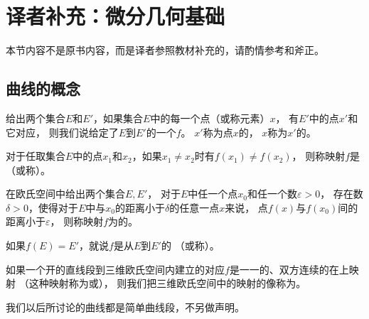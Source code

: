 \section{译者补充：微分几何基础}\label{sec:译者补充：微分几何基础}
\begin{remark}
    本节内容不是原书内容，而是译者参照教材补充的，请酌情参考和斧正。
\end{remark}

\subsection{曲线的概念}\label{sub:曲线的概念}
\begin{definition}
    给出两个集合$E$和$E'$，如果集合$E$中的每一个点（或称元素）$x$，
    有$E'$中的点$x'$和它对应，
    则我们说给定了$E$到$E'$的一个$f$。
    $x'$称为点$x$的，
    $x$称为$x'$的。
\end{definition}
\begin{definition}
    对于任取集合$E$中的点$x_1$和$x_2$，如果$x_1\neq x_2$时有$f(x_1)\neq f(x_2)$，
    则称映射$f$是（或称）。
\end{definition}
\begin{definition}
    在欧氏空间中给出两个集合$E,E'$，
    对于$E$中任一个点$x_0$和任一个数$\varepsilon>0$，
    存在数$\delta>0$，使得对于$E$中与$x_0$的距离小于$\delta$的任意一点$x$来说，
    点$f(x)$与$f(x_0)$间的距离小于$\varepsilon$，
    则称映射$f$为的。
\end{definition}
\begin{definition}
    如果$f(E)=E'$，就说$f$是从$E$到$E'$的
    （或称）。
\end{definition}
\begin{definition}
    如果一个开的直线段到三维欧氏空间内建立的对应$f$是一一的、双方连续的在上映射
    （这种映射称为或），
    则我们把三维欧氏空间中的映射的像称为。
\end{definition}

我们以后所讨论的曲线都是简单曲线段，不另做声明。

